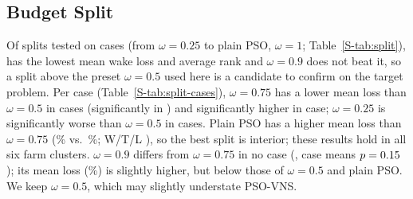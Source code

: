 \subsection{Budget Split}
\label{sec:split}
Of \NSplitNSettings{} splits tested on \NSplitCases{} cases (from $\omega=0.25$ to plain PSO, $\omega=1$; Table~\ref{S-tab:split}), \NSplitBestSetting{} has the lowest mean wake loss and average rank and $\omega=0.9$ does not beat it, so a split above the preset $\omega=0.5$ used here is a candidate to confirm on the target problem.
Per case (Table~\ref{S-tab:split-cases}), $\omega=0.75$ has a lower mean loss than $\omega=0.5$ in \NSplitSeventyFiveLower{} cases (significantly in \NSplitSeventyFiveSig) and significantly higher in \NSplitFiftyBetterSeventyFive{} case; $\omega=0.25$ is significantly worse than $\omega=0.5$ in \NSplitTwentyFiveSig{} cases. Plain PSO has a higher mean loss than $\omega=0.75$ (\NSplitLossHundred\% vs.\ \NSplitLossSeventyFive\%; W/T/L \NSplitHundredVsSeventyFive), so the best split is interior; these results hold in all six farm clusters. $\omega=0.9$ differs from $\omega=0.75$ in no case (\NSplitNinetyVsSeventyFive, case means $p=0.15$); its mean loss (\NSplitLossNinety\%) is slightly higher, but below those of $\omega=0.5$ and plain PSO. We keep $\omega=0.5$, which may slightly understate PSO-VNS.
